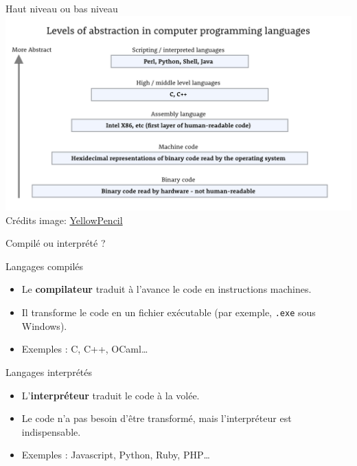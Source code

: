 \begin{frame}{Haut niveau ou bas niveau}
\includegraphics[width=\textwidth]{images/abstraction}\\
\centering
{\small Crédits image: \href{https://yellowpencil.com/blog/imagining-the-future-of-web-design/}{YellowPencil}}
\end{frame}

\begin{frame}{Compilé ou interprété ?}
	\begin{block}{Langages compilés}
		\begin{itemize}
		\item Le \textbf{compilateur} traduit à l'avance le code en instructions machines.
		\item Il transforme le code en un fichier exécutable (par exemple, \texttt{.exe} sous Windows).
		\item Exemples : C, C++, OCaml\dots
		\end{itemize}
	\end{block}
	\begin{block}{Langages interprétés}
		\begin{itemize}
		\item L'\textbf{interpréteur} traduit le code à la volée.
		\item Le code n'a pas besoin d'être transformé, mais l'interpréteur est indispensable.
		\item Exemples : Javascript, Python, Ruby, PHP\dots
		\end{itemize}
	\end{block}
\end{frame}

